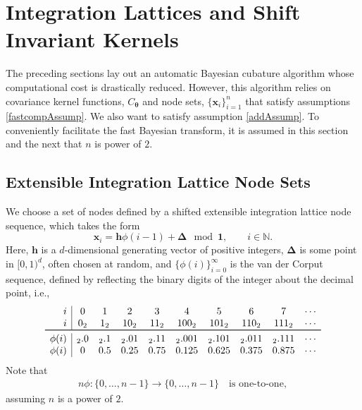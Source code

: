 \documentclass{svjour3}                     %
\newcommand{\bm}[1]{\boldsymbol{#1}}
\newcommand{\naturals}{\mathbb{N}}
\newcommand{\vDelta}{{\boldsymbol{\Delta}}}
\newcommand{\vtheta}{{\bm{\theta}}}
\newcommand{\vh}{\bm{h}}
\newcommand{\vx}{\bm{x}}
\newcommand{\vone}{\bm{1}}
\begin{document}
\section{Integration Lattices and Shift Invariant Kernels}
\label{sec:shift_invariant_kernel}

The preceding sections lay out an automatic Bayesian cubature algorithm whose computational cost is drastically reduced.  However, this algorithm relies on covariance kernel functions, $C_\vtheta$ and node sets, $\{\vx_i\}_{i=1}^n$ that satisfy assumptions \eqref{fastcompAssump}.  We  also want to satisfy assumption \eqref{addAssump}.  
To conveniently facilitate the fast Bayesian transform, it is assumed in this section and the next that $n$ is power of $2$.  

\subsection{Extensible Integration Lattice Node Sets}

We choose a set of nodes defined by a shifted extensible integration lattice node sequence, which takes the form
\begin{equation} \label{eqn:lattice_def}
\vx_{i} = \vh \phi(i-1) + \vDelta \mod \vone, \qquad i \in \naturals.
\end{equation} 
Here, $\vh$ is a $d$-dimensional generating vector of positive integers, $\vDelta$ is some point in $[0,1)^d$, often chosen at random, and $\{\phi(i)\}_{i=0}^\infty$ is the van der Corput sequence, defined by reflecting the binary digits of the integer about the decimal point, i.e., 
\begin{align} \label{vdCDef}
\begin{array}{r|ccccccccccccc}
i & 0 & 1 & 2 & 3 & 4 &  5 & 6 & 7 & \cdots \\
i & 0_2 & 1_2 & 10_2 & 11_2 & 100_2 & 101_2 & 110_2 & 111_2  & \cdots\\
\toprule
\phi(i) & {}_2.0 &  {}_2.1 & {}_2.01 &  {}_2.11  & {}_2.001 &  {}_2.101 & {}_2.011 &  {}_2.111 & \cdots\\
\phi(i) & 0 &  0.5 &  0.25 & 0.75 &  0.125 & 0.625  &  0.375 & 0.875 & \cdots
\end{array}
\end{align}
Note that 
\begin{align} \label{phiprop}
n\phi:\{0, \ldots, n-1 \} \to \{0, \ldots, n-1\} \quad
\text{is one-to-one},
\end{align}
assuming $n$ is a power of $2$.
\end{document}
